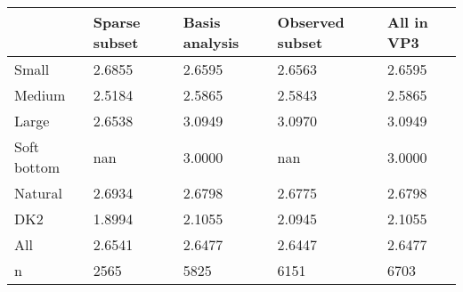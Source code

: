 \begin{tabular}{lllll}
\toprule
 & Sparse subset & Basis analysis & Observed subset & All in VP3 \\
\midrule
Small & 2.6855 & 2.6595 & 2.6563 & 2.6595 \\
Medium & 2.5184 & 2.5865 & 2.5843 & 2.5865 \\
Large & 2.6538 & 3.0949 & 3.0970 & 3.0949 \\
Soft bottom & nan & 3.0000 & nan & 3.0000 \\
Natural & 2.6934 & 2.6798 & 2.6775 & 2.6798 \\
DK2 & 1.8994 & 2.1055 & 2.0945 & 2.1055 \\
All & 2.6541 & 2.6477 & 2.6447 & 2.6477 \\
n & 2565 & 5825 & 6151 & 6703 \\
\bottomrule
\end{tabular}
